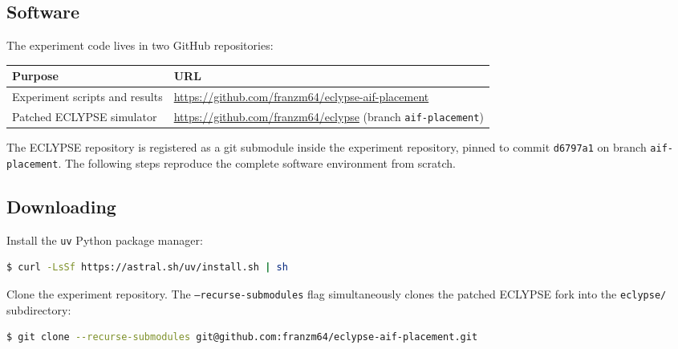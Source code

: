 \documentclass[11pt, a4paper]{article}
\begin{document}



\begin{appendices}

\section{Software}
\label{app:software}

The experiment code lives in two GitHub repositories:

\begin{center}
\begin{tabular}{ll}
\toprule
\textbf{Purpose} & \textbf{URL} \\
\midrule
Experiment scripts and results &
  \url{https://github.com/franzm64/eclypse-aif-placement} \\
Patched ECLYPSE simulator &
  \url{https://github.com/franzm64/eclypse} (branch \texttt{aif-placement}) \\
\bottomrule
\end{tabular}
\end{center}

The ECLYPSE repository is registered as a git submodule inside the experiment
repository, pinned to commit \texttt{d6797a1} on branch \texttt{aif-placement}.
The following steps reproduce the complete software environment from scratch.

\subsection{Downloading}
\label{app:download}

Install the \texttt{uv} Python package manager:

\begin{lstlisting}[language=bash]
$ curl -LsSf https://astral.sh/uv/install.sh | sh
\end{lstlisting}

Clone the experiment repository. The \texttt{--recurse-submodules} flag
simultaneously clones the patched ECLYPSE fork into the \texttt{eclypse/}
subdirectory:

\begin{lstlisting}[language=bash]
$ git clone --recurse-submodules git@github.com:franzm64/eclypse-aif-placement.git
\end{lstlisting}


\end{appendices}
\end{document}
